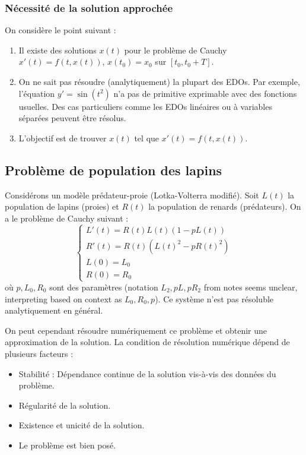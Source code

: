 \documentclass{article}
\begin{document}
\subsubsection{Nécessité de la solution approchée} %
On considère le point suivant :
\begin{enumerate}
    \item Il existe des solutions $x(t)$ pour le problème de Cauchy $x'(t) = f(t, x(t))$, $x(t_0) = x_0$ sur $[t_0, t_0+T]$.
    \item On ne sait pas résoudre (analytiquement) la plupart des EDOs. Par exemple, l'équation $y' = \sin(t^2)$ n'a pas de primitive exprimable avec des fonctions usuelles. Des cas particuliers comme les EDOs linéaires ou à variables séparées peuvent être résolus.
    \item L'objectif est de trouver $x(t)$ tel que $x'(t) = f(t, x(t))$.
\end{enumerate}

\subsection{Problème de population des lapins} %
Considérons un modèle prédateur-proie (Lotka-Volterra modifié).
Soit $L(t)$ la population de lapins (proies) et $R(t)$ la population de renards (prédateurs).
On a le problème de Cauchy suivant :
\[
\begin{cases}
    L'(t) = R(t) L(t) (1 - p L(t)) \\ %
    R'(t) = R(t) (L(t)^2 - p R(t)^2) \\ %
    L(0) = L_0 \\
    R(0) = R_0
\end{cases}
\]
où $p, L_0, R_0$ sont des paramètres (notation $L_2, pL, pR_2$ from notes seems unclear, interpreting based on context as $L_0, R_0, p$).
Ce système n'est pas résoluble analytiquement en général.

On peut cependant résoudre numériquement ce problème et obtenir une approximation de la solution. La condition de résolution numérique dépend de plusieurs facteurs :
\begin{itemize}
    \item Stabilité : Dépendance continue de la solution vis-à-vis des données du problème.
    \item Régularité de la solution.
    \item Existence et unicité de la solution.
    \item Le problème est bien posé.
\end{itemize}
\end{document}
